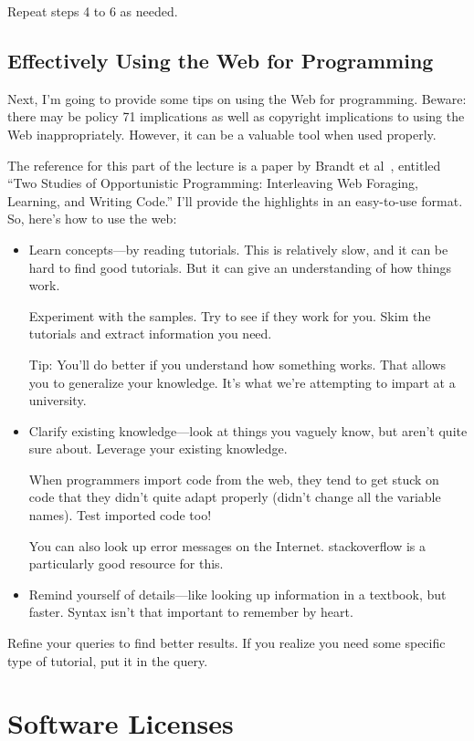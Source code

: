 Repeat steps 4 to 6 as needed.

\subsection*{Effectively Using the Web for Programming}
Next, I'm going to provide some tips on using the Web for programming.
Beware: there may be policy 71 implications as well as copyright
implications to using the Web inappropriately. However, it can be
a valuable tool when used properly. 

The reference for this part of the lecture is a paper by Brandt et
al~\cite{Brandt:2009:TSO:1518701.1518944}, entitled ``Two Studies of
Opportunistic Programming: Interleaving Web Foraging, Learning, and
Writing Code.'' I'll provide the highlights in an easy-to-use format.
So, here's how to use the web:
\begin{itemize}
\item Learn concepts---by reading tutorials. This is relatively slow, and it can be hard 
to find good tutorials. But it can give an understanding of how things work.

Experiment with the samples. Try to see if they work for you. Skim the
tutorials and extract information you need.

Tip: You'll do better if you understand how something works. That allows
you to generalize your knowledge. It's what we're attempting
to impart at a university.
\item Clarify existing knowledge---look at things you vaguely know,
but aren't quite sure about. Leverage your existing knowledge.

When programmers import code from the web, they tend to get stuck on
code that they didn't quite adapt properly (didn't change all
the variable names). Test imported code too!

You can also look up error messages on the Internet. stackoverflow
is a particularly good resource for this.

\item Remind yourself of details---like looking up information in
a textbook, but faster. Syntax isn't that important to remember
by heart.
\end{itemize}

Refine your queries to find better results. If you realize you need
some specific type of tutorial, put it in the query.

\section*{Software Licenses}

